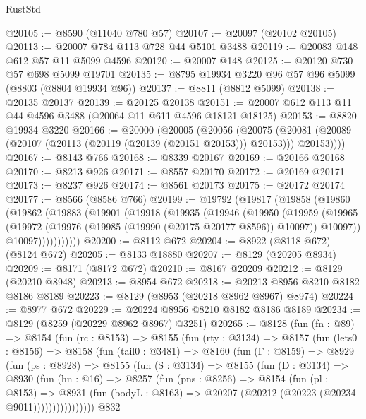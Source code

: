 \begin{lexlean}{RustStd}
\begin{coremodule}
@20105 := @8590 (@11040 @780 @57)
@20107 := @20097 (@20102 @20105)
@20113 := @20007 @784 @113 @728 @44 @5101 @3488
@20119 := @20083 @148 @612 @57 @11 @5099 @4596
@20120 := @20007 @148
@20125 := @20120 @730 @57 @698 @5099 @19701
@20135 := @8795 @19934 @3220 @96 @57 @96 @5099 (@8803 (@8804 @19934 @96))
@20137 := @8811 (@8812 @5099)
@20138 := @20135 @20137
@20139 := @20125 @20138
@20151 := @20007 @612 @113 @11 @44 @4596 @3488 (@20064 @11 @611 @4596 @18121 @18125)
@20153 := @8820 @19934 @3220
@20166 := @20000
    (@20005
      (@20056
        (@20075
          (@20081 (@20089 (@20107 (@20113 (@20119 (@20139 (@20151 @20153))) @20153))) @20153))))
@20167 := @8143 @766
@20168 := @8339 @20167
@20169 := @20166 @20168
@20170 := @8213 @926
@20171 := @8557 @20170
@20172 := @20169 @20171
@20173 := @8237 @926
@20174 := @8561 @20173
@20175 := @20172 @20174
@20177 := @8566 (@8586 @766)
@20199 := @19792
    (@19817
      (@19858
        (@19860
          (@19862
            (@19883
              (@19901
                (@19918
                  (@19935
                    (@19946
                      (@19950
                        (@19959
                          (@19965
                            (@19972 (@19976 (@19985 (@19990 (@20175 @20177 @8596)) @10097)) @10097))
                          @10097)))))))))))
@20200 := @8112 @672
@20204 := @8922 (@8118 @672) (@8124 @672)
@20205 := @8133 @18880
@20207 := @8129 (@20205 @8934)
@20209 := @8171 (@8172 @672)
@20210 := @8167 @20209
@20212 := @8129 (@20210 @8948)
@20213 := @8954 @672
@20218 := @20213 @8956 @8210 @8182 @8186 @8189
@20223 := @8129 (@8953 (@20218 @8962 @8967) @8974)
@20224 := @8977 @672
@20229 := @20224 @8956 @8210 @8182 @8186 @8189
@20234 := @8129 (@8259 (@20229 @8962 @8967) @3251)
@20265 := @8128
    (fun (fn : @89) =>
    @8154
      (fun (rc : @8153) =>
      @8155
        (fun (rty : @3134) =>
        @8157
          (fun (lets0 : @8156) =>
          @8158
            (fun (tail0 : @3481) =>
            @8160
              (fun (Γ : @8159) =>
              @8929
                (fun (ps : @8928) =>
                @8155
                  (fun (S : @3134) =>
                  @8155
                    (fun (D : @3134) =>
                    @8930
                      (fun (hn : @16) =>
                      @8257
                        (fun (pns : @8256) =>
                        @8154
                          (fun (pl : @8153) =>
                          @8931
                            (fun (bodyL : @8163) =>
                            @20207 (@20212 (@20223 (@20234 @9011))))))))))))))))
    @832

\end{coremodule}
\end{lexlean}
